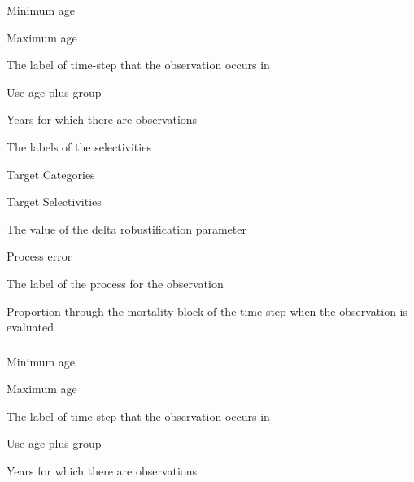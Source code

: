  {Minimum age}

 {Maximum age}

 {The label of time-step that the observation occurs in}

 {Use age plus group}

 {Years for which there are observations}

 {The labels of the selectivities}

 {Target Categories}

 {Target Selectivities}

 {The value of the delta robustification parameter}

 {Process error}

 {The label of the process for the observation}

 {Proportion through the mortality block of the time step when the observation is evaluated}

\subsubsection[Proportions By Category]{}

 {Minimum age}

 {Maximum age}

 {The label of time-step that the observation occurs in}

 {Use age plus group}

 {Years for which there are observations}

